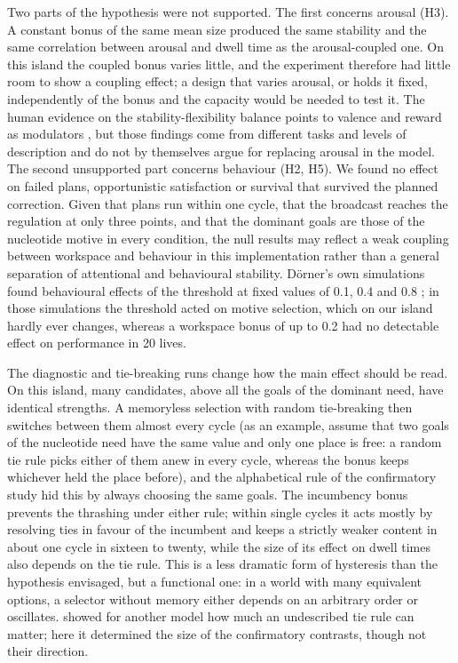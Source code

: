 \documentclass[11pt,a4paper]{article}
\begin{document}
Two parts of the hypothesis were not supported. The first concerns arousal (H3). A constant bonus of the same mean size produced the same stability and the same correlation between arousal and dwell time as the arousal-coupled one. On this island the coupled bonus varies little, and the experiment therefore had little room to show a coupling effect; a design that varies arousal, or holds it fixed, independently of the bonus and the capacity would be needed to test it. The human evidence on the stability-flexibility balance points to valence and reward as modulators \citep{dreisbach2004positive,goschke2014emotional}, but those findings come from different tasks and levels of description and do not by themselves argue for replacing arousal in the model. The second unsupported part concerns behaviour (H2, H5). We found no effect on failed plans, opportunistic satisfaction or survival that survived the planned correction. Given that plans run within one cycle, that the broadcast reaches the regulation at only three points, and that the dominant goals are those of the nucleotide motive in every condition, the null results may reflect a weak coupling between workspace and behaviour in this implementation rather than a general separation of attentional and behavioural stability. D\"orner's own simulations found behavioural effects of the threshold at fixed values of 0.1, 0.4 and 0.8 \citep[pp.~241--248]{doerner2002mechanik}; in those simulations the threshold acted on motive selection, which on our island hardly ever changes, whereas a workspace bonus of up to 0.2 had no detectable effect on performance in 20 lives.

The diagnostic and tie-breaking runs change how the main effect should be read. On this island, many candidates, above all the goals of the dominant need, have identical strengths. A memoryless selection with random tie-breaking then switches between them almost every cycle (as an example, assume that two goals of the nucleotide need have the same value and only one place is free: a random tie rule picks either of them anew in every cycle, whereas the bonus keeps whichever held the place before), and the alphabetical rule of the confirmatory study hid this by always choosing the same goals. The incumbency bonus prevents the thrashing under either rule; within single cycles it acts mostly by resolving ties in favour of the incumbent and keeps a strictly weaker content in about one cycle in sixteen to twenty, while the size of its effect on dwell times also depends on the tie rule. This is a less dramatic form of hysteresis than the hypothesis envisaged, but a functional one: in a world with many equivalent options, a selector without memory either depends on an arbitrary order or oscillates. \citet{edmonds2003replication} showed for another model how much an undescribed tie rule can matter; here it determined the size of the confirmatory contrasts, though not their direction.
\end{document}
